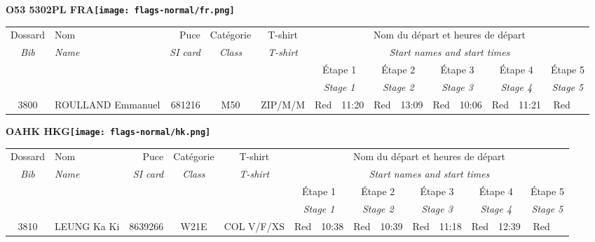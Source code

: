 \documentclass{report}
\begin{document}
\newpage
  \Huge \centering \bfseries O53 5302PL FRA\normalfont \footnotesize \sffamily \hfill \texttt{[image: flags-normal/fr.png]} \newline 
  \begin{longtable}{|c|l|r|c|c|*{5}{cc|}}
    Dossard & Nom  & Puce    & Catégorie & T-shirt & \multicolumn{10}{c|}{Nom du départ et heures de départ} \\
    \itshape Bib     & \itshape Name & \itshape SI card & \itshape Class  & \itshape  T-shirt  & \multicolumn{10}{c|}{\itshape Start names and start times} \\
    \hline
    & & & & & \multicolumn{2}{c|}{Étape 1} & \multicolumn{2}{c|}{Étape 2} & \multicolumn{2}{c|}{Étape 3} & \multicolumn{2}{c|}{Étape 4} & \multicolumn{2}{c|}{Étape 5} \\
    & & & & & \multicolumn{2}{c|}{\itshape Stage 1} & \multicolumn{2}{c|}{\itshape Stage 2} & \multicolumn{2}{c|}{\itshape Stage 3} & \multicolumn{2}{c|}{\itshape Stage 4} & \multicolumn{2}{c|}{\itshape Stage 5} \\
    \hline
    3800 & ROULLAND Emmanuel & 681216 & M50 & ZIP/M/M & Red & 11:20 & Red & 13:09 & Red & 10:06 & Red & 11:21 & Red &  \\
  \end{longtable}
\newpage
  \Huge \centering \bfseries OAHK  HKG\normalfont \footnotesize \sffamily \hfill \texttt{[image: flags-normal/hk.png]} \newline 
  \begin{longtable}{|c|l|r|c|c|*{5}{cc|}}
    Dossard & Nom  & Puce    & Catégorie & T-shirt & \multicolumn{10}{c|}{Nom du départ et heures de départ} \\
    \itshape Bib     & \itshape Name & \itshape SI card & \itshape Class  & \itshape  T-shirt  & \multicolumn{10}{c|}{\itshape Start names and start times} \\
    \hline
    & & & & & \multicolumn{2}{c|}{Étape 1} & \multicolumn{2}{c|}{Étape 2} & \multicolumn{2}{c|}{Étape 3} & \multicolumn{2}{c|}{Étape 4} & \multicolumn{2}{c|}{Étape 5} \\
    & & & & & \multicolumn{2}{c|}{\itshape Stage 1} & \multicolumn{2}{c|}{\itshape Stage 2} & \multicolumn{2}{c|}{\itshape Stage 3} & \multicolumn{2}{c|}{\itshape Stage 4} & \multicolumn{2}{c|}{\itshape Stage 5} \\
    \hline
    3810 & LEUNG Ka Ki & 8639266 & W21E & COL V/F/XS & Red & 10:38 & Red & 10:39 & Red & 11:18 & Red & 12:39 & Red &  \\
  \end{longtable}
\end{document}
